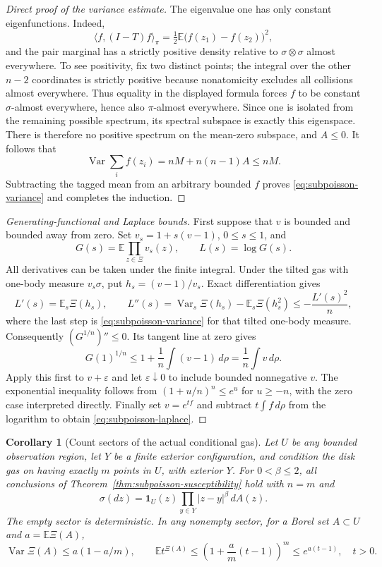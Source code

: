 \documentclass[11pt]{article}
\newtheorem{corollary}[theorem]{Corollary}
\theoremstyle{remark}\newtheorem{remark}[theorem]{Remark}
\begin{document}
\begin{proof}[Direct proof of the variance estimate]
The eigenvalue one has only constant eigenfunctions.  Indeed,
\[
 \langle f,(I-T)f\rangle_\pi
 =\tfrac12\mathbb E\bigl(f(z_1)-f(z_2)\bigr)^2,
\]
and the pair marginal has a strictly positive density relative to
$\sigma\otimes\sigma$ almost everywhere.  To see positivity, fix two
distinct points; the integral over the other $n-2$ coordinates is
strictly positive because nonatomicity excludes all collisions almost
everywhere.  Thus equality in the displayed formula forces $f$ to
be constant $\sigma$-almost everywhere, hence also $\pi$-almost
everywhere.  Since one is isolated from the remaining possible
spectrum, its spectral subspace is exactly this eigenspace.
There is therefore no positive spectrum on the mean-zero subspace,
and $A\le0$.  It follows that
\[
 \operatorname{Var}\sum_i f(z_i)
 =nM+n(n-1)A\le nM.
\]
Subtracting the tagged mean from an arbitrary bounded $f$ proves
\eqref{eq:subpoisson-variance} and completes the induction.
\end{proof}

\begin{proof}[Generating-functional and Laplace bounds]
First suppose that $v$ is bounded and bounded away from zero.  Set
$v_s=1+s(v-1)$, $0\le s\le1$, and
\[
 G(s)=\mathbb E\prod_{z\in\Xi}v_s(z),\qquad L(s)=\log G(s).
\]
All derivatives can be taken under the finite integral.  Under the
tilted gas with one-body measure $v_s\sigma$, put
$h_s=(v-1)/v_s$.  Exact differentiation gives
\[
 L'(s)=\mathbb E_s\Xi(h_s),\qquad
 L''(s)=\operatorname{Var}_s\Xi(h_s)
                -\mathbb E_s\Xi(h_s^2)
 \le-\frac{L'(s)^2}{n},
\]
where the last step is \eqref{eq:subpoisson-variance} for that tilted
one-body measure.  Consequently $(G^{1/n})''\le0$.
Its tangent line at zero gives
\[
 G(1)^{1/n}\le1+\frac1n\int(v-1)\,d\rho
 =\frac1n\int v\,d\rho.
\]
Apply this first to $v+\varepsilon$ and let $\varepsilon\downarrow0$
to include bounded nonnegative $v$.  The exponential inequality
follows from $(1+u/n)^n\le e^u$ for $u\ge-n$, with the zero case
interpreted directly.  Finally set $v=e^{tf}$ and subtract
$t\int f\,d\rho$ from the logarithm to obtain
\eqref{eq:subpoisson-laplace}.
\end{proof}

\begin{corollary}[Count sectors of the actual conditional gas]
\label{cor:conditional-count-susceptibility}
Let $U$ be any bounded observation region, let $Y$ be a finite exterior
configuration, and condition the disk gas on having exactly $m$ points
in $U$, with exterior $Y$.  For $0<\beta\le2$, all conclusions of
Theorem~\ref{thm:subpoisson-susceptibility} hold with $n=m$ and
\[
 \sigma(dz)=\mathbf1_U(z)\prod_{y\in Y}|z-y|^\beta\,dA(z).
\]
The empty sector is deterministic.  In any nonempty sector, for a
Borel set $A\subset U$ and $a=\mathbb E\Xi(A)$,
\[
 \operatorname{Var}\Xi(A)\le a(1-a/m),\qquad
 \mathbb E t^{\Xi(A)}
 \le\left(1+\frac am(t-1)\right)^m\le e^{a(t-1)},\quad t>0.
\]
\end{corollary}
\end{document}
